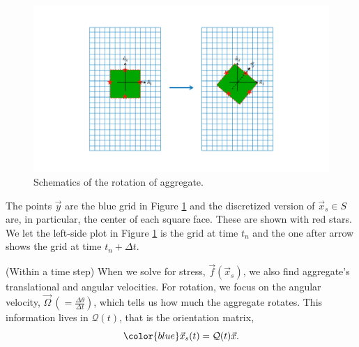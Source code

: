     \begin{figure}[h]
    	\begin{center}
    		\vspace{0.5cm}
    		\includegraphics[scale=0.25]{./figures/fig_schematics}
		
    	\caption{Schematics of the rotation of aggregate.}
    	\label{fig_schematics}
    \end{center}
    \end{figure}
The points $\vec{y}$ are the blue grid in Figure \ref{fig_schematics} and the discretized version of $\vec{x}_s \in S$ are, in particular, the center of each square face. These are shown with red stars. We let the left-side plot in Figure \ref{fig_schematics} is the grid at time $t_n$ and the one after arrow shows the grid at time $t_n + \Delta t$.
\par
(Within a time step) When we solve for stress, $\vec{f}(\vec{x}_s)$, we also find aggregate's translational and angular velocities. For rotation, we focus on the angular velocity, $\vec{\Omega} \ \left(= \frac{\Delta \theta}{\Delta t}\right)$, which tells us how much the aggregate rotates. This information lives in $\mathcal{Q}(t)$, that is the orientation matrix, 
\[
{\color{blue}
\vec{x}_s(t) = \mathcal{Q}(t) \vec{x}.
}
\]
